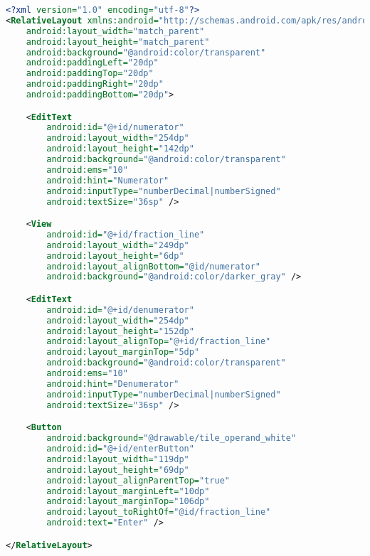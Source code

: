 \begin{lstlisting}[caption=input\_fraction.xml,label=list:input_fraction.xml,language=XML]
<?xml version="1.0" encoding="utf-8"?>
<RelativeLayout xmlns:android="http://schemas.android.com/apk/res/android"
    android:layout_width="match_parent"
    android:layout_height="match_parent"
    android:background="@android:color/transparent"
    android:paddingLeft="20dp"
    android:paddingTop="20dp"
    android:paddingRight="20dp"
    android:paddingBottom="20dp">

    <EditText
        android:id="@+id/numerator"
        android:layout_width="254dp"
        android:layout_height="142dp"
        android:background="@android:color/transparent"
        android:ems="10"
        android:hint="Numerator"
        android:inputType="numberDecimal|numberSigned"
        android:textSize="36sp" />

    <View
        android:id="@+id/fraction_line"
        android:layout_width="249dp"
        android:layout_height="6dp"
        android:layout_alignBottom="@id/numerator"
        android:background="@android:color/darker_gray" />

    <EditText
        android:id="@+id/denumerator"
        android:layout_width="254dp"
        android:layout_height="152dp"
        android:layout_alignTop="@+id/fraction_line"
        android:layout_marginTop="5dp"
        android:background="@android:color/transparent"
        android:ems="10"
        android:hint="Denumerator"
        android:inputType="numberDecimal|numberSigned"
        android:textSize="36sp" />

    <Button
        android:background="@drawable/tile_operand_white"
        android:id="@+id/enterButton"
        android:layout_width="119dp"
        android:layout_height="69dp"
        android:layout_alignParentTop="true"
        android:layout_marginLeft="10dp"
        android:layout_marginTop="106dp"
        android:layout_toRightOf="@id/fraction_line"
        android:text="Enter" />

</RelativeLayout>
\end{lstlisting}    

